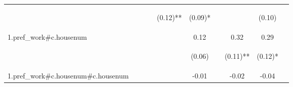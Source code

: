 \begin{center}
\begin{tabular}{lccccccccc}
 & \begin{footnotesize}\end{footnotesize} & \begin{footnotesize}\end{footnotesize} & \begin{footnotesize}\end{footnotesize} & \begin{footnotesize}(0.12)**\end{footnotesize} & \begin{footnotesize}(0.09)*\end{footnotesize} & \begin{footnotesize}\end{footnotesize} & \begin{footnotesize}\end{footnotesize} & \begin{footnotesize}(0.10)\end{footnotesize} & \begin{footnotesize}\end{footnotesize}\\
\noalign{\smallskip}1.pref_work\#c.housenum &  &  &  &  & 0.12 &  & 0.32 & 0.29 & \\
 & \begin{footnotesize}\end{footnotesize} & \begin{footnotesize}\end{footnotesize} & \begin{footnotesize}\end{footnotesize} & \begin{footnotesize}\end{footnotesize} & \begin{footnotesize}(0.06)\end{footnotesize} & \begin{footnotesize}\end{footnotesize} & \begin{footnotesize}(0.11)**\end{footnotesize} & \begin{footnotesize}(0.12)*\end{footnotesize} & \begin{footnotesize}\end{footnotesize}\\
\noalign{\smallskip}1.pref_work\#c.housenum\#c.housenum &  &  &  &  & -0.01 &  & -0.02 & -0.04 & \\

\end{tabular}
\end{center}
